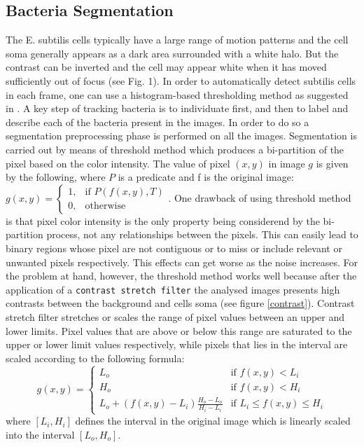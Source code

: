 \documentclass[conference]{IEEEtran}
\begin{document}
\subsection{Bacteria Segmentation}
The E. subtilis cells typically have a large range of motion patterns
and the cell soma generally appears as a dark area surrounded
with a white halo. But the contrast can be inverted
and the cell may appear white when it has moved sufficiently
out of focus (see Fig. 1). In order to automatically detect subtilis
cells in each frame, one can use a histogram-based thresholding
method as suggested in \cite{Cho:1989}.
A key step of tracking bacteria is to individuate first, and then to label and describe each of the bacteria present in the images. In order to do so a segmentation preprocessing phase is performed on all the images. 
Segmentation  is carried out by means of threshold method \cite{Shapiro:2002} which produces a bi-partition of the pixel based on the color intensity. The value of pixel $(x,y)$ in image $g$ is given by the following, where $P$ is a predicate and f is the original image:
${g(x,y) = \begin{cases} 1, & \mbox{if } P(f(x,y),T) \\ 0, & \mbox{otherwise }\end{cases}}$.
One drawback of using threshold method is that pixel color intensity is the only property being considerend by the bi-partition process, not any relationships between the pixels. This can easily lead to binary regions whose pixel are not contiguous or to miss or include relevant or unwanted pixels respectively. This effects can get worse as the noise increases. For the problem at hand, however, the threshold method works well because after the application of a \texttt{contrast stretch filter} the analysed images presents high contrasts between the background and cells soma (see figure \ref{contrast}). Contrast stretch filter  stretches or scales the range of pixel values between an upper and lower limits. Pixel values that are above or below this range are saturated to the upper or lower limit values respectively, while pixels that lies in the interval are scaled according to the following formula: 
\[{g(x,y) = \begin{cases} L_o & \mbox{if } f(x,y) < L_i \\  H_o & \mbox{if } f(x,y) < H_i\\ L_o + (f(x,y)-L_i)\frac{H_o-L_o}{H_i-L_i} & \mbox{if } L_i \leq f(x,y) \leq H_i\end{cases}}\] where  $[L_i,H_i]$ defines the interval in the original image which is linearly scaled into the interval $[L_o,H_o]$.
\end{document}
